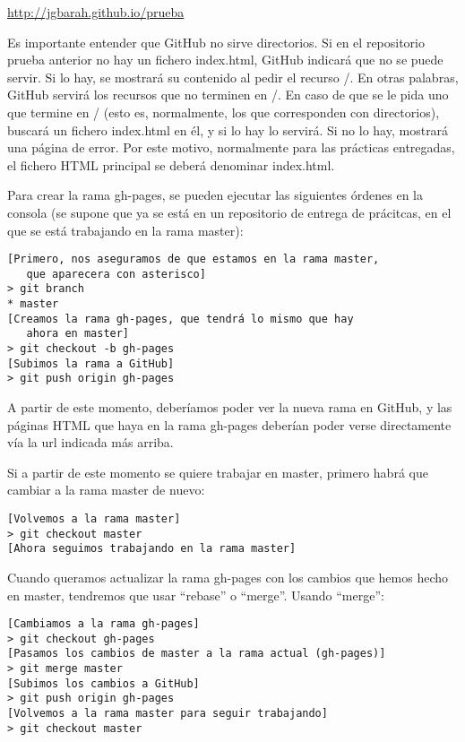 \url{http://jgbarah.github.io/prueba}

Es importante entender que GitHub no sirve directorios. Si en el repositorio prueba anterior no hay un fichero index.html, GitHub indicará que no se puede servir. Si lo hay, se mostrará su contenido al pedir el recurso /. En otras palabras, GitHub servirá los recursos que no terminen en /. En caso de que se le pida uno que termine en / (esto es, normalmente, los que corresponden con directorios), buscará un fichero index.html en él, y si lo hay lo servirá. Si no lo hay, mostrará una página de error. Por este motivo, normalmente para las prácticas entregadas, el fichero HTML principal se deberá denominar index.html.

Para crear la rama gh-pages, se pueden ejecutar las siguientes órdenes en la consola (se supone que ya se está en un repositorio de entrega de prácitcas, en el que se está trabajando en la rama master):

\begin{verbatim}
[Primero, nos aseguramos de que estamos en la rama master,
   que aparecera con asterisco]
> git branch
* master
[Creamos la rama gh-pages, que tendrá lo mismo que hay
   ahora en master]
> git checkout -b gh-pages
[Subimos la rama a GitHub]
> git push origin gh-pages
\end{verbatim}

A partir de este momento, deberíamos poder ver la nueva rama en GitHub, y las páginas HTML que haya en la rama gh-pages deberían poder verse directamente vía la url indicada más arriba.

Si a partir de este momento se quiere trabajar en master, primero habrá que cambiar a la rama master de nuevo:

\begin{verbatim}
[Volvemos a la rama master]
> git checkout master
[Ahora seguimos trabajando en la rama master]
\end{verbatim}

Cuando queramos actualizar la rama gh-pages con los cambios que hemos hecho en master, tendremos que usar ``rebase'' o ``merge''. Usando ``merge'':

\begin{verbatim}
[Cambiamos a la rama gh-pages]
> git checkout gh-pages
[Pasamos los cambios de master a la rama actual (gh-pages)]
> git merge master
[Subimos los cambios a GitHub]
> git push origin gh-pages
[Volvemos a la rama master para seguir trabajando]
> git checkout master
\end{verbatim}

